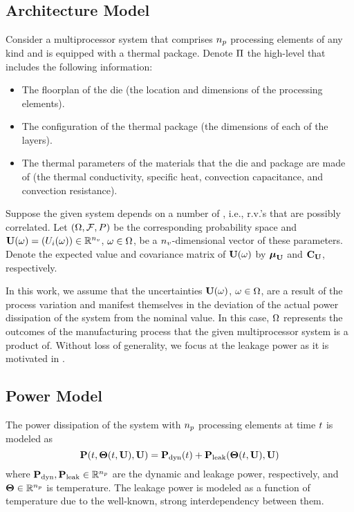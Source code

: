 \subsection{Architecture Model}
Consider a multiprocessor system that comprises ${n_p}$ processing elements of any kind and is equipped with a thermal package. Denote $\Pi$ the high-level  that includes the following information:
\begin{itemize}
  \item The floorplan of the die (the location and dimensions of the processing elements).
  \item The configuration of the thermal package (the dimensions of each of the layers).
  \item The thermal parameters of the materials that the die and package are made of (the thermal conductivity, specific heat, convection capacitance, and convection resistance).
\end{itemize}

Suppose the given system depends on a number of , i.e., r.v.'s that are possibly correlated. Let $(\Omega, \mathcal{F}, P)$ be the corresponding probability space and $\vU(\o) = \vec{\param_i(\o)} \in \real^\params$, $\omega \in \Omega$, be a ${n_v}$-dimensional vector of these parameters. Denote the expected value and covariance matrix of $\vU(\o)$ by $\vExp_\vU$ and $\mCov_\vU$, respectively.

In this work, we assume that the uncertainties $\vU(\o)$, $\omega \in \Omega$, are a result of the process variation and manifest themselves in the deviation of the actual power dissipation of the system from the nominal value. In this case, $\Omega$ represents the outcomes of the manufacturing process that the given multiprocessor system is a product of. Without loss of generality, we focus at the leakage power as it is motivated in .

\subsection{Power Model}
The power dissipation of the system with ${n_p}$ processing elements at time $t$ is modeled as
\[
  \vP(\t, \vTO(\t, \vU), \vU) = \vP_\dyn(\t) + \vP_\leak(\vTO(\t, \vU), \vU)
\]
where $\mathbf{P}_{\text{dyn}}, \mathbf{P}_{\text{leak}} \in \mathbb{R}^{n_p}$ are the dynamic and leakage power, respectively, and ${\boldsymbol\Theta} \in \mathbb{R}^{n_p}$ is temperature. The leakage power is modeled as a function of temperature due to the well-known, strong interdependency between them.

